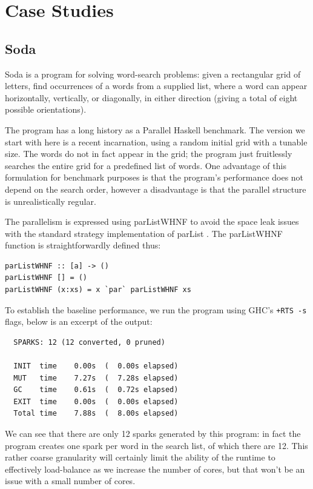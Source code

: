\documentclass[twocolumn,9pt]{sigplanconf}
\newcommand{\codef}[1]{{\fontfamily{cmss}\small#1}}
\let\cite=\citep
\begin{document}


\section{Case Studies}



\subsection{Soda}

Soda is a program for solving word-search problems: given a
rectangular grid of letters, find occurrences of a words from a
supplied list, where a word can appear horizontally, vertically, or
diagonally, in either direction (giving a total of eight possible
orientations).

The program has a long history as a Parallel Haskell benchmark.
The version we start with here is a recent incarnation,
using a random initial grid with a tunable size.  The words do not in
fact appear in the grid; the program just fruitlessly searches the
entire grid for a predefined list of words.  One advantage of this
formulation for benchmark purposes is that the program's performance
does not depend on the search order, however a disadvantage is that
the parallel structure is unrealistically regular.

The parallelism is expressed using \codef{parListWHNF} to avoid the
space leak issues with the standard strategy implementation of
\codef{parList} \cite{multicore-ghc}.  The \codef{parListWHNF}
function is straightforwardly defined thus:

\begin{verbatim}
parListWHNF :: [a] -> ()
parListWHNF [] = ()
parListWHNF (x:xs) = x `par` parListWHNF xs
\end{verbatim}

To establish the baseline performance, we run the program using GHC's
\texttt{+RTS -s} flags, below is an excerpt of the output:

\begin{verbatim}
  SPARKS: 12 (12 converted, 0 pruned)

  INIT  time    0.00s  (  0.00s elapsed)
  MUT   time    7.27s  (  7.28s elapsed)
  GC    time    0.61s  (  0.72s elapsed)
  EXIT  time    0.00s  (  0.00s elapsed)
  Total time    7.88s  (  8.00s elapsed)
\end{verbatim}

We can see that there are only 12 sparks generated by this program: in
fact the program creates one spark per word in the search list, of
which there are 12.  This rather coarse granularity will certainly
limit the ability of the runtime to effectively load-balance as we
increase the number of cores, but that won't be an issue with a small
number of cores.
\end{document}
